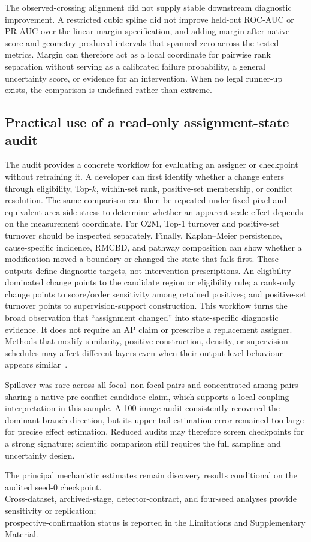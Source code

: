 The observed-crossing alignment did not supply stable downstream diagnostic improvement. A restricted cubic spline did not improve held-out ROC-AUC or PR-AUC over the linear-margin specification, and adding margin after native score and geometry produced intervals that spanned zero across the tested metrics. Margin can therefore act as a local coordinate for pairwise rank separation without serving as a calibrated failure probability, a general uncertainty score, or evidence for an intervention. When no legal runner-up exists, the comparison is undefined rather than extreme.

\subsection{Practical use of a read-only assignment-state audit}

The audit provides a concrete workflow for evaluating an assigner or checkpoint without retraining it. A developer can first identify whether a change enters through eligibility, Top-$k$, within-set rank, positive-set membership, or conflict resolution. The same comparison can then be repeated under fixed-pixel and equivalent-area-side stress to determine whether an apparent scale effect depends on the measurement coordinate. For O2M, Top-1 turnover and positive-set turnover should be inspected separately. Finally, Kaplan--Meier persistence, cause-specific incidence, RMCBD, and pathway composition can show whether a modification moved a boundary or changed the state that fails first. These outputs define diagnostic targets, not intervention prescriptions. An eligibility-dominated change points to the candidate region or eligibility rule; a rank-only change points to score/order sensitivity among retained positives; and positive-set turnover points to supervision-support construction. This workflow turns the broad observation that ``assignment changed'' into state-specific diagnostic evidence. It does not require an AP claim or prescribe a replacement assigner. Methods that modify similarity, positive construction, density, or supervision schedules may affect different layers even when their output-level behaviour appears similar~\cite{wang2021nwd,xu2022rfla,shi2024simd,xu2023dcfl,wang2024yolov10}.

Spillover was rare across all focal--non-focal pairs and concentrated among pairs sharing a native pre-conflict candidate claim, which supports a local coupling interpretation in this sample. A 100-image audit consistently recovered the dominant branch direction, but its upper-tail estimation error remained too large for precise effect estimation. Reduced audits may therefore screen checkpoints for a strong signature; scientific comparison still requires the full sampling and uncertainty design.

The principal mechanistic estimates remain discovery results conditional on the audited seed-0 checkpoint.\\[-2pt] Cross-dataset, archived-stage, detector-contract, and four-seed analyses provide sensitivity or replication;\\[-2pt] prospective-confirmation status is reported in the Limitations and Supplementary Material.

